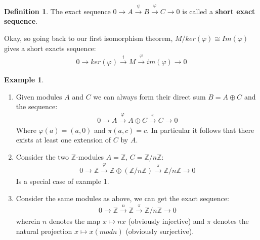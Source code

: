 \documentclass[12pt]{book}
\theoremstyle{definition}
\newtheorem{definition}[theorem]{Definition}
\newtheorem{example}[theorem]{Example}
\begin{document}
\begin{definition}
    The exact sequence $0 \rightarrow A \xrightarrow{\psi} B \xrightarrow{\varphi} C \rightarrow 0$ is called a \textbf{short exact sequence}.
\end{definition}

Okay, so going back to our first isomorphism theorem, $M/ker(\varphi) \cong Im(\varphi)$ gives a short exacts sequence: 
\begin{align*}
    0 \rightarrow ker(\varphi) \xrightarrow{i} M \xrightarrow{\varphi} im(\varphi) \rightarrow 0
\end{align*}

\begin{example}
    \begin{enumerate}
        \item Given modules $A$ and $C$ we can always form their direct sum $B = A \oplus C$ and the sequence: 
        \begin{align*}
            0 \rightarrow A \xrightarrow{\varphi} A \oplus C \xrightarrow{\pi} C \rightarrow 0
        \end{align*}
        Where $\varphi(a) = (a,0)$ and $\pi(a,c) = c$. In particular it follows that there exists at least one extension of $C$ by $A$. 
        \item Consider the two $\mathbb{Z}$-modules $A = \mathbb{Z}$, $C = \mathbb{Z}/n\mathbb{Z}$:
        \begin{align*}
            0 \rightarrow \mathbb{Z} \xrightarrow{\varphi} \mathbb{Z} \oplus (\mathbb{Z}/n\mathbb{Z}) \xrightarrow{\pi} \mathbb{Z}/n\mathbb{Z} \rightarrow 0
        \end{align*}
        Is a special case of example 1. 
        \item Consider the same modules as above, we can get the exact sequence: 
        \begin{align*}
            0 \rightarrow \mathbb{Z} \xrightarrow{n} \mathbb{Z} \xrightarrow{\pi} \mathbb{Z}/n\mathbb{Z} \rightarrow 0
        \end{align*}
        wherein $n$ denotes the map $x \mapsto nx$ (obviously injective) and $\pi$ denotes the natural projection $ x \mapsto x (mod n)$ (obviously surjective).  
    \end{enumerate}
\end{example}
\end{document}
